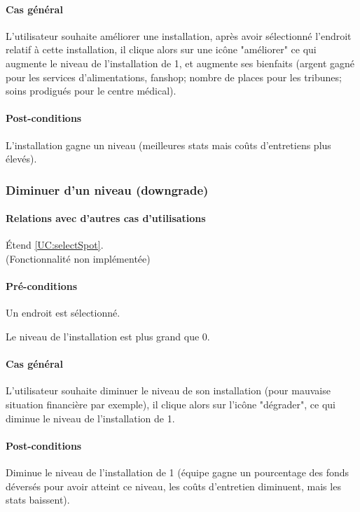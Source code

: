 \paragraph{Cas général}
L'utilisateur souhaite améliorer une installation, après avoir sélectionné l'endroit relatif à cette installation, il clique alors sur une icône "améliorer" ce qui augmente le niveau de l'installation de 1, et augmente ses bienfaits (argent gagné pour les services d'alimentations, fanshop; nombre de places pour les tribunes; soins prodigués pour le centre médical).
\paragraph{Post-conditions}
\begin{list}{}{\leftmargin=1.5em}
\item{L'installation gagne un niveau (meilleures stats mais coûts d'entretiens plus élevés).}
\end{list}

\subsubsection{Diminuer d'un niveau (downgrade)}
\label{UC:downgrade}
\paragraph{Relations avec d'autres cas d'utilisations}
Étend \ref{UC:selectSpot}.
\\(Fonctionnalité non implémentée)
\paragraph{Pré-conditions}
\begin{list}{}{\leftmargin=1.5em}
\item{Un endroit est sélectionné.}
\item{Le niveau de l'installation est plus grand que 0.}
\end{list}
\paragraph{Cas général}
L'utilisateur souhaite diminuer le niveau de son installation (pour mauvaise situation financière par exemple), il clique alors sur l'icône "dégrader", ce qui diminue le niveau de l'installation de 1. 
\paragraph{Post-conditions}
Diminue le niveau de l'installation de 1 (équipe gagne un pourcentage des fonds déversés pour avoir atteint ce niveau, les coûts d'entretien diminuent, mais les stats baissent).


